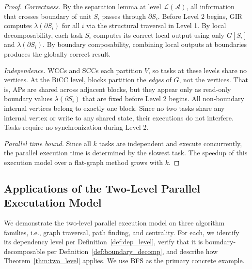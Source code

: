 \begin{proof}[Proof]
\textit{Correctness.}
By the separation lemma at level $\mathcal{L}(\mathcal{A})$,
all information that crosses boundary of unit $S_i$ passes through $\partial S_i$.
Before Level 2 begins, GIR computes $\lambda(\partial S_i)$ for all $i$
via the structural traversal in Level 1.
By local decomposability, each task $S_i$ computes its correct local output
using only $G[S_i]$ and $\lambda(\partial S_i)$.
By boundary composability, combining local outputs at boundaries
produces the globally correct result.

\textit{Independence.}
WCCs and SCCs each partition $V$, so tasks at these levels share no vertices.
At the BiCC level, blocks partition the \emph{edges} of $G$, not the vertices.
That is, APs are shared across adjacent blocks,
but they appear only as read-only boundary values $\lambda(\partial S_i)$
that are fixed before Level 2 begins.
All non-boundary internal vertices belong to exactly one block.
Since no two tasks share any internal vertex or write to any shared state,
their executions do not interfere.
Tasks require no synchronization during Level 2.

\textit{Parallel time bound.}
Since all $k$ tasks are independent and execute concurrently,
the parallel execution time is determined by the slowest task. The speedup of this execution model over a flat-graph method grows with $k$.
\end{proof}




\subsection{Applications of the Two-Level Parallel Executation Model}
\label{subsec:instantiations}


We demonstrate the two-level parallel execution model on three algorithm families, i.e., graph traversal, path finding, and centrality.
For each, we identify its dependency level per Definition~\ref{def:dep_level},
verify that it is boundary-decomposable per Definition~\ref{def:boundary_decomp},
and describe how Theorem~\ref{thm:two_level} applies.
We use BFS as the primary concrete example.

